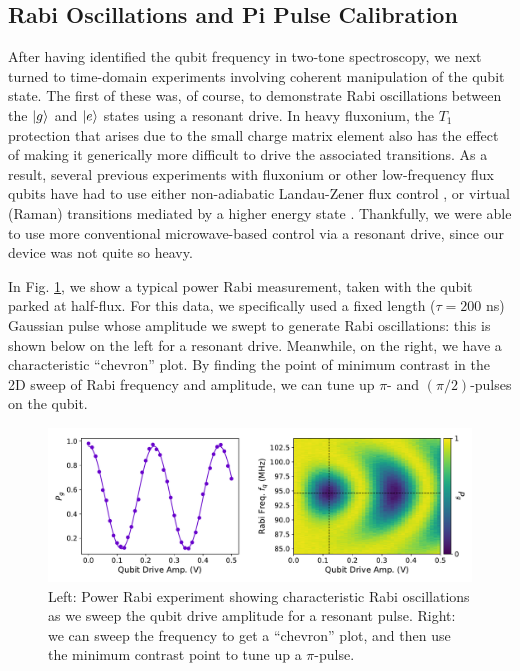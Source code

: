 \subsection{Rabi Oscillations and Pi Pulse Calibration}

After having identified the qubit frequency in two-tone spectroscopy, we next turned to time-domain experiments involving coherent manipulation of the qubit state. The first of these was, of course, to demonstrate Rabi oscillations between the $\lvert g\rangle$ and $\lvert e\rangle$ states using a resonant drive. In heavy fluxonium, the $T_1$ protection that arises due to the small charge matrix element also has the effect of making it generically more difficult to drive the associated transitions. As a result, several previous experiments with fluxonium or other low-frequency flux qubits have had to use either non-adiabatic Landau-Zener flux control \cite{oliver2005mach, campbell2020universal, zhang2021universal}, or virtual (Raman) transitions mediated by a higher energy state \cite{earnest2018realization}. Thankfully, we were able to use more conventional microwave-based control via a resonant drive, since our device was not quite so heavy. 

In Fig. \ref{fig:4_rabi}, we show a typical power Rabi measurement, taken with the qubit parked at half-flux. For this data, we specifically used a fixed length ($\tau = 200$ ns) Gaussian pulse whose amplitude we swept to generate Rabi oscillations: this is shown below on the left for a resonant drive. Meanwhile, on the right, we have a characteristic ``chevron'' plot. By finding the point of minimum contrast in the 2D sweep of Rabi frequency and amplitude, we can tune up $\pi$- and $(\pi/2)$-pulses on the qubit. 

\begin{figure}[h]
    \centering
    \includegraphics[width=0.95\linewidth]{Figures/4/rabi.pdf}
    \caption[Power Rabi experiment and Rabi chevrons.]{Left: Power Rabi experiment showing characteristic Rabi oscillations as we sweep the qubit drive amplitude for a resonant pulse. Right: we can sweep the frequency to get a ``chevron'' plot, and then use the minimum contrast point to tune up a $\pi$-pulse.}
    \label{fig:4_rabi}
\end{figure}

